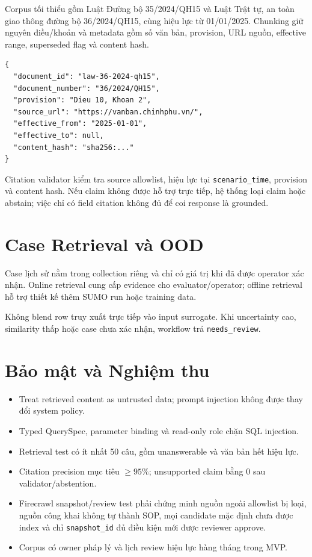 Corpus tối thiểu gồm Luật Đường bộ 35/2024/QH15 và Luật Trật tự, an toàn giao thông đường bộ 36/2024/QH15, cùng hiệu lực từ 01/01/2025. Chunking giữ nguyên điều/khoản và metadata gồm số văn bản, provision, URL nguồn, effective range, superseded flag và content hash.

\begin{lstlisting}[caption={Citation có cấu trúc},label={lst:citation}]
{
  "document_id": "law-36-2024-qh15",
  "document_number": "36/2024/QH15",
  "provision": "Dieu 10, Khoan 2",
  "source_url": "https://vanban.chinhphu.vn/",
  "effective_from": "2025-01-01",
  "effective_to": null,
  "content_hash": "sha256:..."
}
\end{lstlisting}

Citation validator kiểm tra source allowlist, hiệu lực tại \texttt{scenario\_time}, provision và content hash. Nếu claim không được hỗ trợ trực tiếp, hệ thống loại claim hoặc abstain; việc chỉ có field citation không đủ để coi response là grounded.

\section{Case Retrieval và OOD}

Case lịch sử nằm trong collection riêng và chỉ có giá trị khi đã được operator xác nhận. Online retrieval cung cấp evidence cho evaluator/operator; offline retrieval hỗ trợ thiết kế thêm SUMO run hoặc training data.

\begin{tcolorbox}[dangerbox]
Không blend row truy xuất trực tiếp vào input surrogate. Khi uncertainty cao, similarity thấp hoặc case chưa xác nhận, workflow trả \texttt{needs\_review}.
\end{tcolorbox}

\section{Bảo mật và Nghiệm thu}

\begin{itemize}[itemsep=3pt]
  \item Treat retrieved content as untrusted data; prompt injection không được thay đổi system policy.
  \item Typed QuerySpec, parameter binding và read-only role chặn SQL injection.
  \item Retrieval test có ít nhất 50 câu, gồm unanswerable và văn bản hết hiệu lực.
  \item Citation precision mục tiêu $\geq95\%$; unsupported claim bằng 0 sau validator/abstention.
  \item Firecrawl snapshot/review test phải chứng minh nguồn ngoài allowlist bị loại, nguồn công khai không tự thành SOP, mọi candidate mặc định chưa được index và chỉ \texttt{snapshot\_id} đủ điều kiện mới được reviewer approve.
  \item Corpus có owner pháp lý và lịch review hiệu lực hàng tháng trong MVP.
\end{itemize}
